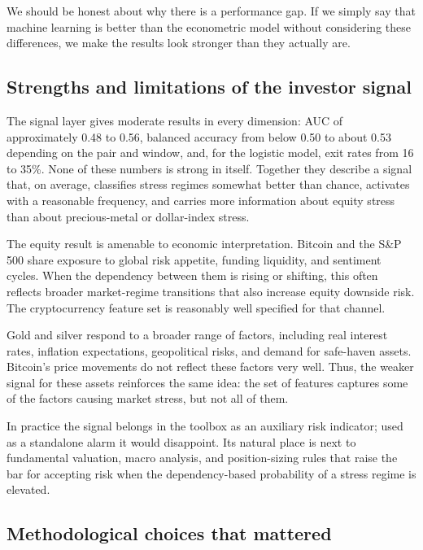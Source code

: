 We should be honest about why there is a performance gap. If we simply say that machine learning is better than the econometric model without considering these differences, we make the results look stronger than they actually are.

\subsection{Strengths and limitations of the investor signal}

The signal layer gives moderate results in every dimension: AUC of approximately 0.48 to 0.56, balanced accuracy from below 0.50 to about 0.53 depending on the pair and window, and, for the logistic model, exit rates from 16 to 35\%. None of these numbers is strong in itself. Together they describe a signal that, on average, classifies stress regimes somewhat better than chance, activates with a reasonable frequency, and carries more information about equity stress than about precious-metal or dollar-index stress.

The equity result is amenable to economic interpretation. Bitcoin and the S\&P 500 share exposure to global risk appetite, funding liquidity, and sentiment cycles. When the dependency between them is rising or shifting, this often reflects broader market-regime transitions that also increase equity downside risk. The cryptocurrency feature set is reasonably well specified for that channel.

Gold and silver respond to a broader range of factors, including real interest rates, inflation expectations, geopolitical risks, and demand for safe-haven assets. Bitcoin's price movements do not reflect these factors very well. Thus, the weaker signal for these assets reinforces the same idea: the set of features captures some of the factors causing market stress, but not all of them.

In practice the signal belongs in the toolbox as an auxiliary risk indicator; used as a standalone alarm it would disappoint. Its natural place is next to fundamental valuation, macro analysis, and position-sizing rules that raise the bar for accepting risk when the dependency-based probability of a stress regime is elevated.

\subsection{Methodological choices that mattered}

